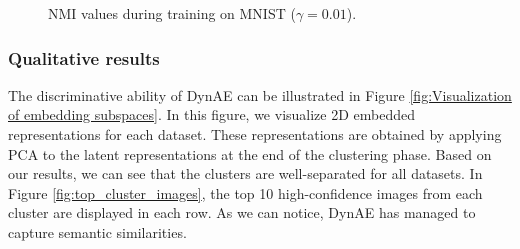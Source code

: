 \documentclass{article}
\begin{document}
\begin{figure}
\vskip 0.2in
\centering
    \caption{NMI values during training on MNIST ($\gamma = 0.01$).}
\vskip -0.2in
\label{fig:NMI_tuned_MNIST}
\end{figure}

\subsubsection{Qualitative results}
The discriminative ability of DynAE can be illustrated in Figure \ref{fig:Visualization of embedding subspaces}. In this figure, we visualize 2D embedded representations for each dataset. These representations are obtained by applying PCA to the latent representations at the end of the clustering phase. Based on our results, we can see that the clusters are well-separated for all datasets. In Figure \ref{fig:top_cluster_images}, the top 10 high-confidence images from each cluster are displayed in each row. As we can notice, DynAE has managed to capture semantic similarities.

\begin{figure*}[ht]
\vskip 0.2in
\centering
    \caption{Visualizing 2D embedded subspaces to show the discriminative ability of DynAE.}
    \label{fig:Visualization of embedding subspaces}
\vskip -0.2in
\end{figure*}

\begin{figure*}[ht]
\vskip 0.2in
\centering
    \caption{Top 10 high-confidence images from each cluster displayed in each row.}
\vskip -0.2in
\label{fig:top_cluster_images}
\end{figure*}
\end{document}
